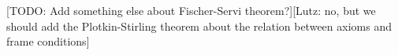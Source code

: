 \documentclass[a4paper]{article}
\theoremstyle{plain}
\theoremstyle{definition}
\newcommand{\marianela}[1]{{\color{purple}[Marianela: #1]}}
\newcommand{\lutz}[1]{{\color{notgreen}[Lutz: #1]}}
\newcommand{\todo}[1]{{\color{red}[TODO: #1]}}
\newcommand*{\ax}[1]{\mathsf{#1}}
\newcommand*{\kax}[1][]		{\ax{k_{#1}}}
\newcommand*{\IK}{\mathsf{IK}}
\newcommand*{\NOT}{\neg}
\newcommand*{\AND}{\mathbin{\wedge}}
\newcommand*{\TOP}{\mathord{\top}}
\newcommand*{\OR}{\mathbin{\vee}}
\newcommand*{\BOT}{\mathord{\bot}}
\newcommand*{\IMP}{\mathbin{\scalebox{.9}{\raise.2ex\hbox{$\supset$}}}}
\newcommand*{\BOX}{\mathord{\Box}}
\newcommand*{\DIA}{\mathord{\Diamond}}
\begin{document}
\todo{Add something else about Fischer-Servi theorem?}\lutz{no, but we should add the Plotkin-Stirling theorem about the relation between axioms and frame conditions}
%
%
%
%
%
\end{document}
